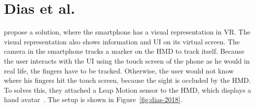 \section{Dias et al.}\label{section:dias-2018}
\citeauthor{Dias.2018} propose a solution, where the smartphone has a visual representation in \ac{VR}. The visual representation also shows information and \ac{UI} on its virtual screen. The camera in the smartphone tracks a marker on the \ac{HMD} to track itself. Because the user interacts with the \ac{UI} using the touch screen of the phone as he would in real life, the fingers have to be tracked. Otherwise, the user would not know where his fingers hit the touch screen, because the sight is occluded by the \ac{HMD}. To solves this, they attached a Leap Motion sensor to the \ac{HMD}, which displays a hand avatar~\cite{Dias.2018}. The setup is shown in Figure~\ref{fig:dias-2018}. 

